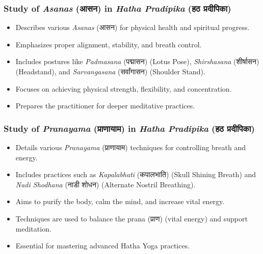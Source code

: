 \begin{frame}[fragile]\frametitle{Study of \textit{Asanas} (आसन) in \textit{Hatha Pradipika} (हठ प्रदीपिका)}

      \begin{itemize}
		\item Describes various \textit{Asanas} (आसन) for physical health and spiritual progress.
		\item Emphasizes proper alignment, stability, and breath control.
		\item Includes postures like \textit{Padmasana} (पद्मासन) (Lotus Pose), \textit{Shirshasana} (शीर्षासन) (Headstand), and \textit{Sarvangasana} (सर्वांगासन) (Shoulder Stand).
		\item Focuses on achieving physical strength, flexibility, and concentration.
		\item Prepares the practitioner for deeper meditative practices.
	  \end{itemize}

\end{frame}

\begin{frame}[fragile]\frametitle{Study of \textit{Pranayama} (प्राणायाम) in \textit{Hatha Pradipika} (हठ प्रदीपिका)}

      \begin{itemize}
		\item Details various \textit{Pranayama} (प्राणायाम) techniques for controlling breath and energy.
		\item Includes practices such as \textit{Kapalabhati} (कपालभाति) (Skull Shining Breath) and \textit{Nadi Shodhana} (नाडी शोधन) (Alternate Nostril Breathing).
		\item Aims to purify the body, calm the mind, and increase vital energy.
		\item Techniques are used to balance the prana (प्राण) (vital energy) and support meditation.
		\item Essential for mastering advanced Hatha Yoga practices.
	  \end{itemize}

\end{frame}



